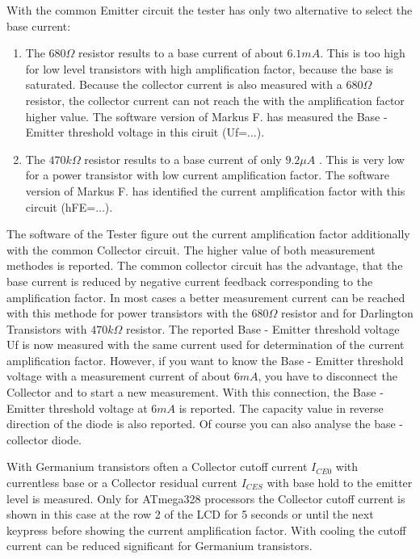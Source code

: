 With the common Emitter circuit the tester has only two alternative to select the base current:
\begin{enumerate}
\item The \(680\Omega\) resistor results to a base current of about \(6.1mA\). 
This is too high for low level transistors with high amplification factor, because the base is saturated.
Because the collector current is also measured with a \(680\Omega\) resistor, the collector current
can not reach the with the amplification factor higher value.
The software version of Markus F. has measured the Base - Emitter threshold voltage in this ciruit (Uf=...).\\
\item The \(470k\Omega\) resistor results to a base current of only \(9.2\mu A\) .
This is very low for a power transistor with low current amplification factor.
The software version of Markus F. has identified the current amplification factor with this circuit (hFE=...).\\
\end{enumerate}

The software of the Tester figure out the current amplification factor additionally with the common Collector circuit.
The higher value of both measurement methodes is reported.
The common collector circuit has the advantage, that the base current is reduced by negative current feedback corresponding
to the amplification factor. 
In most cases a better measurement current can be reached with this methode for power transistors
with the \(680\Omega\) resistor and for Darlington Transistors with \(470k\Omega\) resistor.
The reported Base - Emitter threshold voltage Uf is now measured with the same current used 
for determination of the current amplification factor.
However, if you want to know the Base - Emitter threshold voltage with a measurement current of about \(6mA\),
you have to disconnect the Collector and to start a new measurement.
With this connection, the Base - Emitter threshold voltage at \(6mA\) is reported. The capacity value
in reverse direction of the diode is also reported.
Of course you can also analyse the base - collector diode.

With Germanium transistors often a Collector cutoff current \(I_{CE0}\) with currentless base or 
a Collector residual current \(I_{CES}\) with base hold to the emitter level is measured.
Only for ATmega328 processors the Collector cutoff current is shown in this case at the row 2 of the LCD 
for 5 seconds or until the next keypress before showing the current amplification factor. 
With cooling the cutoff current can be reduced significant for Germanium transistors.


